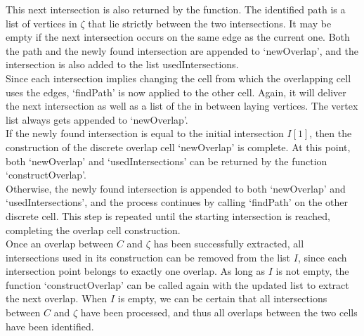 This next intersection is also returned by the function. 
The identified path is a list of vertices in $\zeta$ that lie strictly between the two intersections. 
It may be empty if the next intersection occurs on the same edge as the current one. 
Both the path and the newly found intersection are appended to `newOverlap', and the intersection is also added to the list usedIntersections.\\
Since each intersection implies changing the cell from which the overlapping cell uses the edges, `findPath' is now applied to the other cell. 
Again, it will deliver the next intersection as well as a list of the in between laying vertices. 
The vertex list always gets appended to `newOverlap'. \\
If the newly found intersection is equal to the initial intersection $I[1]$, then the construction of the discrete overlap cell `newOverlap' is complete. 
At this point, both `newOverlap' and `usedIntersections' can be returned by the function `constructOverlap'. \\
Otherwise, the newly found intersection is appended to both `newOverlap' and `usedIntersections', and the process continues by calling `findPath' on the other discrete cell.   
This step is repeated until the starting intersection is reached, completing the overlap cell construction. \\
Once an overlap between $C$ and $\zeta$ has been successfully extracted, all intersections used in its construction can be removed from the list $I$, since each intersection point belongs to exactly one overlap. 
As long as $I$ is not empty, the function `constructOverlap' can be called again with the updated list to extract the next overlap. 
When $I$ is empty, we can be certain that all intersections between $C$ and $\zeta$ have been processed, and thus all overlaps between the two cells have been identified. \\

